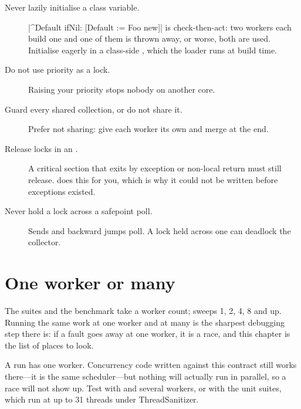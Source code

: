 \begin{description}
\item[Never lazily initialise a class variable.]
  \ct|^Default ifNil: [Default := Foo new]| is check-then-act: two workers
  each build one and one of them is thrown away, or worse, both are used.
  Initialise eagerly in a class-side , which the loader runs at
  build time.
\item[Do not use priority as a lock.] Raising your priority stops nobody on
  another core.
\item[Guard every shared collection, or do not share it.] Prefer not sharing:
  give each worker its own and merge at the end.
\item[Release locks in an .] A critical section that exits by
  exception or non-local return must still release.  does this for
  you, which is why it could not be written before exceptions existed.
\item[Never hold a lock across a safepoint poll.] Sends and backward jumps
  poll. A lock held across one can deadlock the collector.
\end{description}

\section{One worker or many}

The suites and the benchmark take a worker count;  sweeps 1, 2,
4, 8 and up. Running the same work at one worker and at many is the sharpest
debugging step there is: if a fault goes away at one worker, it is a race, and
this chapter is the list of places to look.

\begin{stnote}
A  run has one worker. Concurrency code written against
this contract still works there---it is the same scheduler---but nothing will
actually run in parallel, so a race will not show up. Test with  and
several workers, or with the unit suites, which run at up to 31 threads under
ThreadSanitizer.
\end{stnote}
